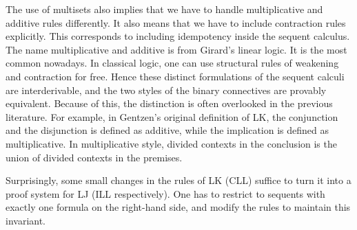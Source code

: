 The use of multisets also implies 
that we have to handle multiplicative and additive rules differently. 
It also means that we have to include contraction rules explicitly. 
This corresponds to including idempotency inside the sequent calculus. 
The name multiplicative and additive is from Girard's linear logic\cite{Girard87tcs}.
It is the most common nowadays. 
%
In classical logic, one can use structural rules of weakening and contraction for free.
Hence these distinct formulations of the sequent calculi are interderivable, 
and the two styles of the binary connectives are provably equivalent. 
Because of this, the distinction is often overlooked
in the previous literature. For example, in Gentzen's original
definition of {\sf LK}, the conjunction and the
disjunction is defined as additive, while the implication is defined
as multiplicative. In multiplicative style, divided contexts in the
conclusion is the union of divided contexts in the premises.

Surprisingly, some small changes in the rules of {\sf LK} ({\sf CLL}) suffice 
to turn it into a proof system for {\sf LJ} ({\sf ILL} respectively). 
One has to restrict to sequents with exactly one formula on the right-hand side, 
and modify the rules to maintain this invariant. 

